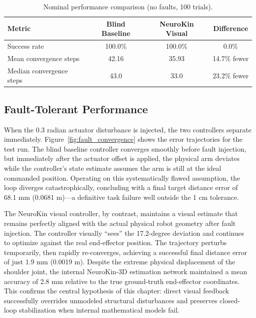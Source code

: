 \documentclass[12pt,a4paper,oneside]{report}
\begin{document}
\begin{table}[H]
\centering
\caption{Nominal performance comparison (no faults, 100 trials).}
\label{tab:nominal_performance}
\begin{tabular}{lccc}
\toprule
\textbf{Metric} & \textbf{Blind Baseline} & \textbf{NeuroKin Visual} & \textbf{Difference} \\
\midrule
Success rate & 100.0\% & 100.0\% & 0.0\% \\
Mean convergence steps & 42.16 & 35.93 & 14.7\% fewer \\
Median convergence steps & 43.0 & 33.0 & 23.2\% fewer \\
\bottomrule
\end{tabular}
\end{table}

\subsection{Fault-Tolerant Performance}
\label{subsec:fault_tolerant_performance}

When the 0.3 radian actuator disturbance is injected, the two controllers separate immediately. Figure~\ref{fig:fault_convergence} shows the error trajectories for the test run. The blind baseline controller converges smoothly before fault injection, but immediately after the actuator offset is applied, the physical arm deviates while the controller's state estimate assumes the arm is still at the ideal commanded position. Operating on this systematically flawed assumption, the loop diverges catastrophically, concluding with a final target distance error of 68.1 mm (0.0681 m)—a definitive task failure well outside the 1 cm tolerance.

The NeuroKin visual controller, by contrast, maintains a visual estimate that remains perfectly aligned with the actual physical robot geometry after fault injection. The controller visually ``sees'' the 17.2-degree deviation and continues to optimize against the real end-effector position. The trajectory perturbs temporarily, then rapidly re-converges, achieving a successful final distance error of just 1.9 mm (0.0019 m). Despite the extreme physical displacement of the shoulder joint, the internal NeuroKin-3D estimation network maintained a mean accuracy of 2.8 mm relative to the true ground-truth end-effector coordinates. This confirms the central hypothesis of this chapter: direct visual feedback successfully overrides unmodeled structural disturbances and preserves closed-loop stabilization when internal mathematical models fail.
\end{document}
